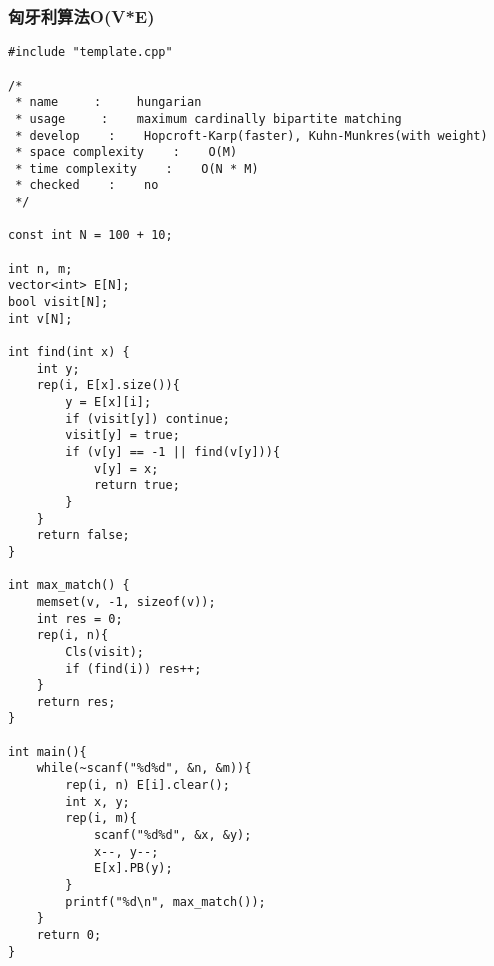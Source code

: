 \subsubsection{匈牙利算法O(V*E)}
\begin{verbatim}
#include "template.cpp"

/*
 * name     :     hungarian    
 * usage     :    maximum cardinally bipartite matching
 * develop    :    Hopcroft-Karp(faster), Kuhn-Munkres(with weight)
 * space complexity    :    O(M)
 * time complexity    :    O(N * M)
 * checked    :    no
 */

const int N = 100 + 10;

int n, m;
vector<int> E[N];
bool visit[N];
int v[N];

int find(int x) {
    int y;
    rep(i, E[x].size()){
        y = E[x][i];
        if (visit[y]) continue;
        visit[y] = true;
        if (v[y] == -1 || find(v[y])){
            v[y] = x;
            return true;
        }
    }
    return false;
}

int max_match() {
    memset(v, -1, sizeof(v));
    int res = 0;
    rep(i, n){
        Cls(visit);
        if (find(i)) res++;
    }
    return res;
}

int main(){
    while(~scanf("%d%d", &n, &m)){
        rep(i, n) E[i].clear();
        int x, y;
        rep(i, m){
            scanf("%d%d", &x, &y);
            x--, y--;
            E[x].PB(y);
        }
        printf("%d\n", max_match());
    }
    return 0;
}
\end{verbatim}
